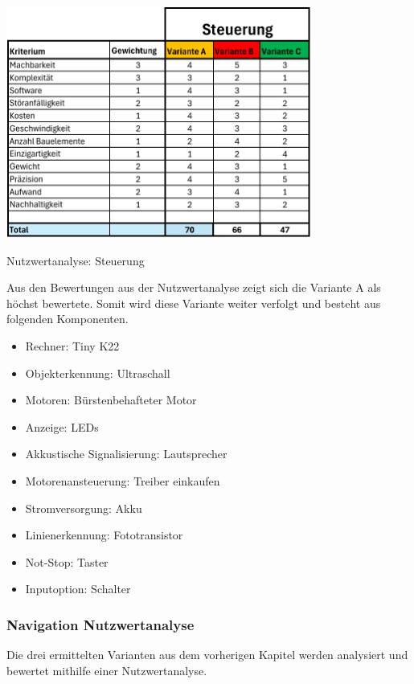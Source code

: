 \begin{table}[H]
\centering
\includegraphics[width=0.75\textwidth]{assets/Nutzwertanalyse-ET.pdf}
\caption{Nutzwertanalyse: Steuerung}
\label{table:nutzwert-ET}
\end{table}

Aus den Bewertungen aus der Nutzwertanalyse zeigt sich die Variante A als höchst bewertete. Somit wird diese Variante weiter verfolgt und besteht aus folgenden Komponenten.

\begin{itemize}
    \item Rechner: Tiny K22
    \item Objekterkennung: Ultraschall
    \item Motoren: Bürstenbehafteter Motor
    \item Anzeige: LEDs 
    \item Akkustische Signalisierung: Lautsprecher
    \item Motorenansteuerung: Treiber einkaufen
    \item Stromversorgung: Akku
    \item Linienerkennung: Fototransistor
    \item Not-Stop: Taster
    \item Inputoption: Schalter
\end{itemize}

\subsubsection{Navigation Nutzwertanalyse}

Die drei ermittelten Varianten aus dem vorherigen Kapitel werden analysiert und bewertet mithilfe einer Nutzwertanalyse.


